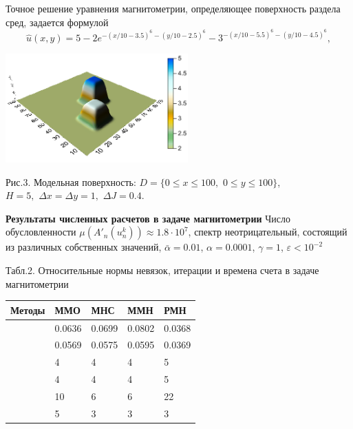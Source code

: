 \documentclass[10pt,pdf, mathserif, hyperref={unicode}]{beamer}
\begin{document}
\begin{frame}
	Точное решение уравнения магнитометрии, определяющее поверхность раздела сред, задается формулой %
	\begin{equation*}
	\hat{u}(x,y)=5-2e^{-(x/10-3.5)^6-(y/10-2.5)^6}-3^{-(x/10-5.5)^6-(y/10-4.5)^6},
	\end{equation*}
	\begin{center}
		\includegraphics[width=7cm, height=4 cm]{Magne_exact.png}            %
	\end{center}
	
	\begin{center}
		Рис.3. Модельная поверхность: $D=\{0\le x\le 100, \,\,0\le y\le 100\}$, \\ $  H=5,\,\,\Delta x=\Delta y=1,\,\,\Delta J=0.4$.
	\end{center}
\end{frame}
\begin{frame}{\small\textbf{Результаты численных расчетов в задаче магнитометрии}}
	Число обусловленности $\mu(A'_n(u_n^k))\approx 1.8\cdot 10^7$, спектр неотрицательный, состоящий из различных собственных значений, $\bar\alpha=0.01$, $\alpha = 0.0001$, $\gamma=1$, $\varepsilon < 10^{-2}$
	
	\begin{table}
		\centering
		{\scriptsize Табл.2. Относительные нормы невязок, итерации и времена счета в задаче магнитометрии}
		
		\smallskip
		\begin{tabular}{|p{}|p{}|p{}|p{}|p{}|}
			\hline
			\rule{0cm}{0.5cm}
			Методы & ММО & МНС & ММН & РМН \\ \hline
			\rule{0cm}{0.5cm}
			\multirow{$\Delta$} & 0.0636 & 0.0699 & 0.0802 & 0.0368	 \\ \cline{2-5} 
			\rule{0cm}{0.5cm}
			&  0.0569   & 0.0575    &  0.0595   &  0.0369   \\ \hline
			\rule{0cm}{0.5cm}
			\multirow{$N$} & 4  &  4   &   4  &  5    \\ \cline{2-5}
			\rule{0cm}{0.5cm}
			&  4   &   4  &  4   &  5   \\ \hline
			\rule{0cm}{0.5cm}
			\multirow{$T$ (сек)}    &  10   &  6   &  6  & 22    \\ \cline{2-5}
			\rule{0cm}{0.5cm}
			& 5    & 3    &  3   &   3  \\ \hline
		\end{tabular}
	\end{table}
\end{frame}
\end{document}
